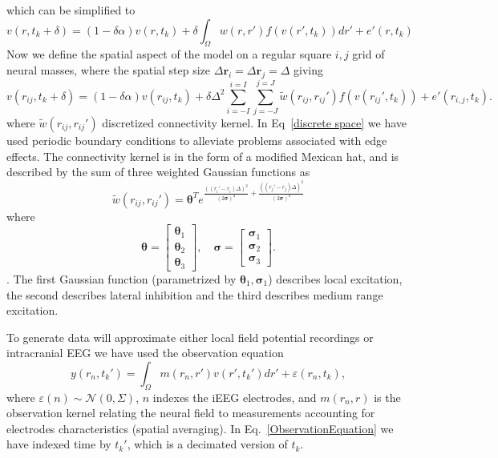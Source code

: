 \documentclass[onecolumn,draftcls]{IEEEtran}
\begin{document}
which can be simplified to
\begin{equation}\label{discrete time model2}
	v\left(r,t_k + \delta \right) =  (1 - \delta \alpha) v(r,t_k) + \delta \int_\Omega  {w\left( r,r' \right)f\left( {v\left( r',t_k \right)} \right)dr'} + e'(r,t_k)
\end{equation}
Now we define the spatial aspect of the model on a regular square $i,j$ grid of neural masses, where the spatial step size $\Delta \mathbf{r}_i = \Delta \mathbf{r}_j = \Delta $ giving
\begin{equation}\label{discrete space}
	v\left(r_{ij},t_k + \delta \right) =  (1 - \delta \alpha)v(r_{ij},t_k) + \delta \Delta^2 \sum_{i=-I}^{i=I}{\sum_{j=-J}^{j=J}{\tilde{w}\left( r_{ij},r_{ij}' \right)f\left( v\left( r_{ij}',t_k \right) \right)} }+ e'(r_{i,j},t_k).
\end{equation}
where $\tilde{w}(r_{ij},r_{ij}')$ discretized connectivity kernel. In Eq~\ref{discrete space} we have used periodic boundary conditions to alleviate problems associated with edge effects. The connectivity kernel is in the form of a modified Mexican hat, and is described by the sum of three weighted Gaussian functions as
\begin{equation}
	\tilde{w}(r_{ij},r_{ij}') = \mathbf{\theta}^T e^{\frac{\left(\left(r_i'-r_i\right)\Delta\right)^2}{(2\mathbf{\sigma})^2} + \frac{\left(\left(r_j'-r_j\right)\Delta\right)^2}{(2\mathbf{\sigma})^2}}
\end{equation}
where
\begin{equation}
 \mathbf{\theta}=\begin{bmatrix} \mathbf{\theta}_{1}\\\mathbf{\theta}_{2}\\\mathbf \theta_{3}\end{bmatrix},\quad \mathbf{\sigma}=\begin{bmatrix}\mathbf{\sigma}_1\\\mathbf{\sigma}_2\\ \mathbf{\sigma}_3\end{bmatrix}.
\end{equation}.
The first Gaussian function (parametrized by $\mathbf{\theta}_1, \mathbf{\sigma}_1$) describes local excitation, the second describes lateral inhibition and the third describes medium range excitation. 
 
To generate data will approximate either local field potential recordings or intracranial EEG we have used the observation equation
\begin{equation}\label{ObservationEquation}
    y(r_n,t_k') = \int_\Omega  m( r_n,r' ) v( r',t_k' ) dr'  + \varepsilon ( r_n,t_k ),
\end{equation}
where $\varepsilon( n )\sim\mathcal{N}(0,\Sigma)$, $n$ indexes the iEEG electrodes, and $m(r_n,r)$ is the observation kernel relating the neural field to measurements accounting for electrodes characteristics (spatial averaging). In Eq.~\ref{ObservationEquation} we have indexed time by $t_k'$, which is a decimated version of $t_k$. 
\end{document}
